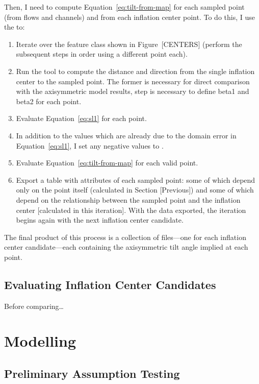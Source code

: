 Then, I need to compute Equation~\eqref{eq:tilt-from-map} for each sampled point (from flows and channels) and from each inflation center point. To do this, I use the  to:
\begin{enumerate}
    \item Iterate over the feature class shown in Figure~[CENTERS] (perform the subsequent steps in order using a different point each).
    \item Run the  tool to compute the distance and direction from the single inflation center to the sampled point. The former is necessary for direct comparison with the axisymmetric model results, step is necessary to define \acs{beta1} and \acs{beta2} for each point.
    \item Evaluate Equation~\eqref{eq:sl1} for each point.
    \item In addition to the values which are already  due to the domain error in Equation~\eqref{eq:sl1}, I set any negative values to .
    \item Evaluate Equation~\eqref{eq:tilt-from-map} for each valid point.
    \item Export a table with attributes of each sampled point: some of which depend only on the point itself (calculated in Section [Previous]) and some of which depend on the relationship between the sampled point and the inflation center [calculated in this iteration]. With the data exported, the iteration begins again with the next inflation center candidate.
\end{enumerate}
The final product of this process is a collection of  files---one for each inflation center candidate---each containing the axisymmetric tilt angle implied at each point. 


\subsection{Evaluating Inflation Center Candidates}

Before comparing\dots

\section{Modelling}

\subsection{Preliminary Assumption Testing}

